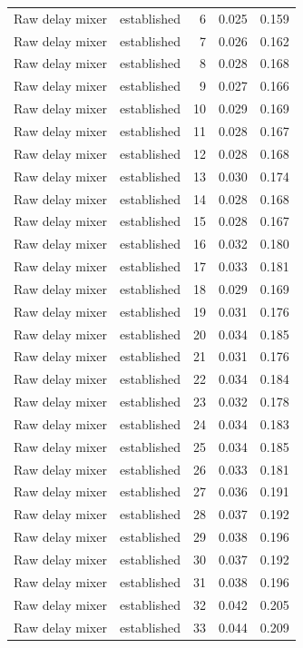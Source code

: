 \begin{tabular}{llrrr}
Raw delay mixer & established & 6 & 0.025 & 0.159 \\
Raw delay mixer & established & 7 & 0.026 & 0.162 \\
Raw delay mixer & established & 8 & 0.028 & 0.168 \\
Raw delay mixer & established & 9 & 0.027 & 0.166 \\
Raw delay mixer & established & 10 & 0.029 & 0.169 \\
Raw delay mixer & established & 11 & 0.028 & 0.167 \\
Raw delay mixer & established & 12 & 0.028 & 0.168 \\
Raw delay mixer & established & 13 & 0.030 & 0.174 \\
Raw delay mixer & established & 14 & 0.028 & 0.168 \\
Raw delay mixer & established & 15 & 0.028 & 0.167 \\
Raw delay mixer & established & 16 & 0.032 & 0.180 \\
Raw delay mixer & established & 17 & 0.033 & 0.181 \\
Raw delay mixer & established & 18 & 0.029 & 0.169 \\
Raw delay mixer & established & 19 & 0.031 & 0.176 \\
Raw delay mixer & established & 20 & 0.034 & 0.185 \\
Raw delay mixer & established & 21 & 0.031 & 0.176 \\
Raw delay mixer & established & 22 & 0.034 & 0.184 \\
Raw delay mixer & established & 23 & 0.032 & 0.178 \\
Raw delay mixer & established & 24 & 0.034 & 0.183 \\
Raw delay mixer & established & 25 & 0.034 & 0.185 \\
Raw delay mixer & established & 26 & 0.033 & 0.181 \\
Raw delay mixer & established & 27 & 0.036 & 0.191 \\
Raw delay mixer & established & 28 & 0.037 & 0.192 \\
Raw delay mixer & established & 29 & 0.038 & 0.196 \\
Raw delay mixer & established & 30 & 0.037 & 0.192 \\
Raw delay mixer & established & 31 & 0.038 & 0.196 \\
Raw delay mixer & established & 32 & 0.042 & 0.205 \\
Raw delay mixer & established & 33 & 0.044 & 0.209 \\

\end{tabular}
